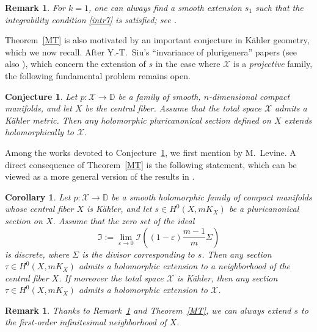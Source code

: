 \documentclass[english]{amsart}
\newcommand{\DD}{\mathbb D}
\newcommand{\cX}{\mathcal{X}}
\newcommand{\ep}{\varepsilon}
\newtheorem{conjecture}[thm]{Conjecture}
\newtheorem{cor}[thm]{Corollary}
\newtheorem{remark}[thm]{Remark}
\numberwithin{equation}{thm}
\begin{document}
\begin{remark}\label{1orderex}
	For $k=1$, one can always find a smooth extension $s_1$ such that the integrability condition \eqref{intr7} is satisfied; see \cite[Thm 4.1]{CP-inv}.
\end{remark}

\noindent
Theorem~\ref{MT} is also motivated by an important conjecture in K\"ahler geometry, which we now recall. After Y.-T.~Siu's ``invariance of plurigenera'' papers \cite{Siu98,Siu00} (see also \cite{Pau07}), which concern the extension of $s$ in the case where $\cX$ is a \emph{projective} family, the following fundamental problem remains open.

\begin{conjecture}\label{Siuconj}\cite{Siu00}
	Let $p:\cX\to \DD$ be a family of smooth, $n$-dimensional compact manifolds, and let $X$ be the central fiber. Assume that the total space $\cX$ admits a K\"ahler metric. Then any holomorphic pluricanonical section defined on $X$ extends holomorphically to $\cX$.
\end{conjecture}

\smallskip

\noindent
Among the works devoted to Conjecture~\ref{Siuconj}, we first mention \cite{Lev83,Lev85} by M.~Levine. A direct consequence of Theorem~\ref{MT} is the following statement, which can be viewed as a more general version of the results in \cite{Lev83,Lev85}.

\begin{cor}\label{corlev}\cite[Cor 1.5]{CP-inv}
	Let $p:\cX\to \DD$ be a smooth holomorphic family of compact manifolds whose central fiber $X$ is K\"ahler, and let $s\in H^0(X,mK_X)$ be a pluricanonical section on $X$.
	Assume that the zero set of the ideal
	\[
	\mathfrak I := \lim_{\ep\to 0}\mathcal I\!\left((1-\ep)\frac{m-1}{m}\Sigma\right)
	\]
	is discrete, where $\Sigma$ is the divisor corresponding to $s$.
	Then any section $\tau \in H^0(X,mK_X)$ admits a holomorphic extension to a neighborhood of the central fiber $X$.
	If moreover the total space $\cX$ is K\"ahler, then any section $\tau \in H^0(X,mK_X)$ admits a holomorphic extension to $\cX$.
\end{cor}

\begin{remark}\cite{CP-inv}
	Thanks to Remark~\ref{1orderex} and Theorem~\ref{MT}, we can always extend $s$ to the first-order infinitesimal neighborhood of $X$.
\end{remark}
\end{document}

